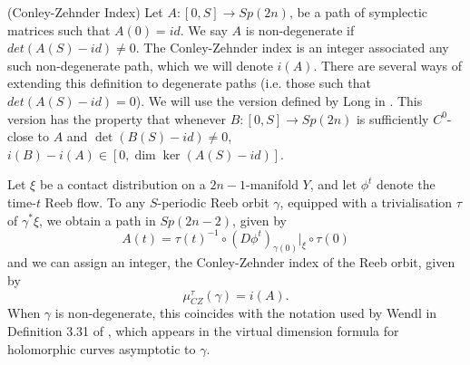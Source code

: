 \documentclass{article}
\numberwithin{equation}{section}
\numberwithin{figure}{section}
\begin{document}
\begin{defn}(Conley-Zehnder Index)
Let $A:[0,S]\rightarrow Sp(2n)$, be a path of symplectic matrices such that $A(0)=id$. We say $A$ is non-degenerate if $det(A(S)-id)\neq 0$. The Conley-Zehnder index is an integer associated any such non-degenerate path, which we will denote $i(A)$. There are several ways of extending this definition to degenerate paths (i.e. those such that $det(A(S)-id)=0$). We will use the version defined by Long in \cite{Long_index}. This version has the property that whenever $B:[0,S]\rightarrow Sp(2n)$ is sufficiently $C^0$-close to $A$ and $\det(B(S)-id)\neq 0$, $i(B)-i(A)\in [0,\dim\ker(A(S)-id)]$. 

Let $\xi$ be a contact distribution on a $2n-1$-manifold $Y$, and let $\phi^t$ denote the time-$t$ Reeb flow. To any $S$-periodic Reeb orbit $\gamma$, equipped with a trivialisation $\tau$ of $\gamma^*\xi$, we obtain a path in $Sp(2n-2)$, given by
\begin{equation}
    A(t)=\tau(t)^{-1}\circ (D\phi^t)_{\gamma(0)}|_\xi\circ \tau(0)
\end{equation}
and we can assign an integer, the Conley-Zehnder index of the Reeb orbit, given by
\begin{equation}
    \mu_{CZ}^\tau(\gamma)=i(A).
\end{equation}
When $\gamma$ is non-degenerate, this coincides with the notation used by Wendl in Definition 3.31 of \cite{Wendl}, which appears in the virtual dimension formula for holomorphic curves asymptotic to $\gamma$.
\end{defn}
\end{document}
